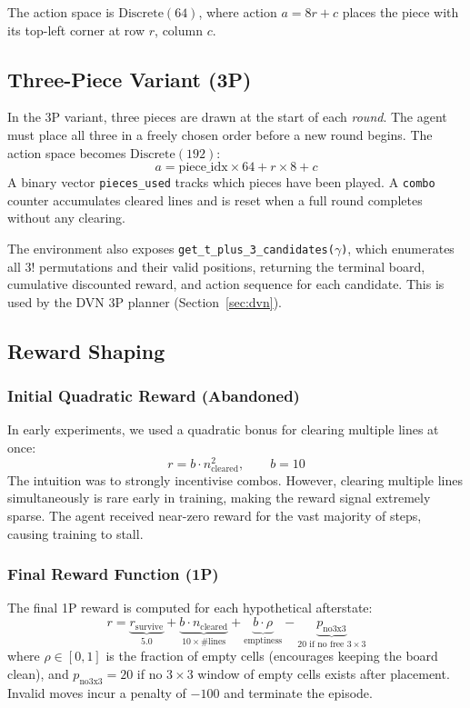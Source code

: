 \documentclass[10pt]{article}
\begin{document}
The action space is $\text{Discrete}(64)$, where action $a = 8r + c$ places the piece with its top-left corner at row $r$, column $c$.

\subsection{Three-Piece Variant (3P)}

In the 3P variant, three pieces are drawn at the start of each \emph{round}. The agent must place all three in a freely chosen order before a new round begins. The action space becomes $\text{Discrete}(192)$:
\[
a = \text{piece\_idx} \times 64 + r \times 8 + c
\]
A binary vector \texttt{pieces\_used} tracks which pieces have been played. A \texttt{combo} counter accumulates cleared lines and is reset when a full round completes without any clearing.

The environment also exposes \texttt{get\_t\_plus\_3\_candidates($\gamma$)}, which enumerates all $3!$ permutations and their valid positions, returning the terminal board, cumulative discounted reward, and action sequence for each candidate. This is used by the DVN 3P planner (Section~\ref{sec:dvn}).

\subsection{Reward Shaping}
\label{sec:reward}

\subsubsection{Initial Quadratic Reward (Abandoned)}

In early experiments, we used a quadratic bonus for clearing multiple lines at once:
\[
r = b \cdot n_{\text{cleared}}^2, \qquad b = 10
\]
The intuition was to strongly incentivise combos. However, clearing multiple lines simultaneously is rare early in training, making the reward signal extremely sparse. The agent received near-zero reward for the vast majority of steps, causing training to stall.

\subsubsection{Final Reward Function (1P)}

The final 1P reward is computed for each hypothetical afterstate:
\begin{equation}
r = \underbrace{r_{\text{survive}}}_{5.0}
  + \underbrace{b \cdot n_{\text{cleared}}}_{10 \times \#\text{lines}}
  + \underbrace{b \cdot \rho}_{\text{emptiness}}
  - \underbrace{p_{\text{no3x3}}}_{20 \text{ if no free }3\times3}
\end{equation}
where $\rho \in [0,1]$ is the fraction of empty cells (encourages keeping the board clean), and $p_{\text{no3x3}} = 20$ if no $3\times3$ window of empty cells exists after placement. Invalid moves incur a penalty of $-100$ and terminate the episode.
\end{document}
